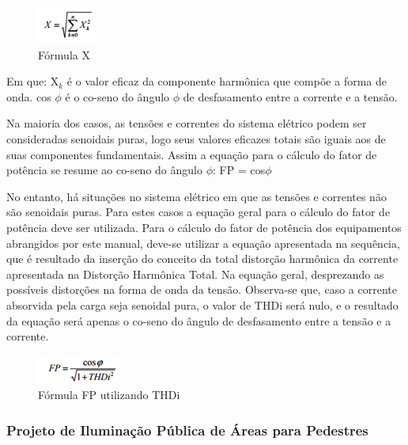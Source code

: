 \begin{figure}[H]
	 \centering
	\label{FormulaX}
	 \includegraphics[keepaspectratio=true,scale=0.8]{figuras/FormulaX.png}
	 \caption{F\'ormula X}
\end{figure}

Em que: X$_{k}$ \'e o valor eficaz da componente harm\^onica que comp\~oe a forma de onda.
cos $\phi$ \'e o co-seno do \^angulo $\phi$ de desfasamento entre a corrente e a tens\~ao. \cite{COPELPARANA}

	Na maioria dos casos, as tens\~oes e correntes do sistema el\'etrico podem ser consideradas senoidais puras, logo seus valores eficazes totais s\~ao iguais aos de suas componentes fundamentais. Assim a equa\c{c}\~ao para o c\'alculo do fator de pot\^encia se resume ao co-seno do \^angulo $\phi$: FP = cos$\phi$
	
	No entanto, h\'a situa\c{c}\~oes no sistema el\'etrico em que as tens\~oes e correntes n\~ao s\~ao senoidais puras. Para estes casos a equa\c{c}\~ao geral para o c\'alculo do fator de pot\^encia deve ser utilizada. Para o c\'alculo do fator de pot\^encia dos equipamentos abrangidos por este manual, deve-se utilizar a equa\c{c}\~ao apresentada na sequ\^encia, que \'e resultado da inser\c{c}\~ao do conceito da total distor\c{c}\~ao harm\^onica da corrente apresentada na Distor\c{c}\~ao Harm\^onica Total. Na equa\c{c}\~ao geral, desprezando as poss\'iveis distor\c{c}\~oes na forma de onda da tens\~ao. Observa-se que, caso a corrente absorvida pela carga seja senoidal pura, o valor de THDi ser\'a nulo, e o resultado da equa\c{c}\~ao ser\'a apenas o co-seno do \^angulo de desfasamento entre a tens\~ao e a corrente.

\begin{figure}[H]
	 \centering
	\label{FormulaFP2}
	 \includegraphics[keepaspectratio=true,scale=0.8]{figuras/FormulaFP2.png}
	 \caption{F\'ormula FP utilizando THDi}
\end{figure}

\subsubsection{Projeto de Ilumina\c{c}\~ao P\'ublica de \'Areas para Pedestres}

